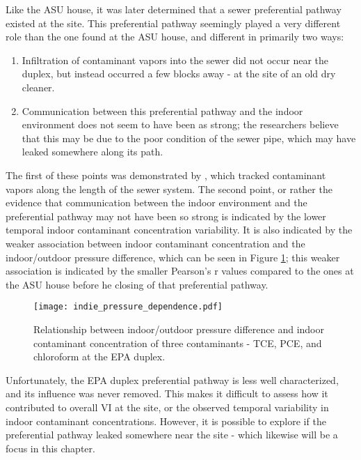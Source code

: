 Like the ASU house, it was later determined that a sewer preferential pathway existed at the site.
This preferential pathway seemingly played a very different role than the one found at the ASU house, and different in primarily two ways:
\begin{enumerate}
  \item Infiltration of contaminant vapors into the sewer did not occur near the duplex, but instead occurred a few blocks away - at the site of an old dry cleaner.
  \item Communication between this preferential pathway and the indoor environment does not seem to have been as strong; the researchers believe that this may be due to the poor condition of the sewer pipe, which may have leaked somewhere along its path.
\end{enumerate}
The first of these points was demonstrated by \citeauthor{mchugh_evidence_2017}\cite{mchugh_evidence_2017}, which tracked contaminant vapors along the length of the sewer system.
The second point, or rather the evidence that communication between the indoor environment and the preferential pathway may not have been so strong is indicated by the lower temporal indoor contaminant concentration variability.
It is also indicated by the weaker association between indoor contaminant concentration and the indoor/outdoor pressure difference, which can be seen in Figure \ref{fig:indie_pressure_dependence}; this weaker association is indicated by the smaller Pearson's r values compared to the ones at the ASU house before he closing of that preferential pathway.\par

\begin{figure}[htb!]
  \centering
  \texttt{[image: indie\_pressure\_dependence.pdf]}
  \caption{Relationship between indoor/outdoor pressure difference and indoor contaminant concentration of three contaminants - TCE, PCE, and chloroform at the EPA duplex.}
  \label{fig:indie_pressure_dependence}
\end{figure}

Unfortunately, the EPA duplex preferential pathway is less well characterized, and its influence was never removed.
This makes it difficult to assess how it contributed to overall VI at the site, or the observed temporal variability in indoor contaminant concentrations.
However, it is possible to explore if the preferential pathway leaked somewhere near the site - which likewise will be a focus in this chapter.\par

